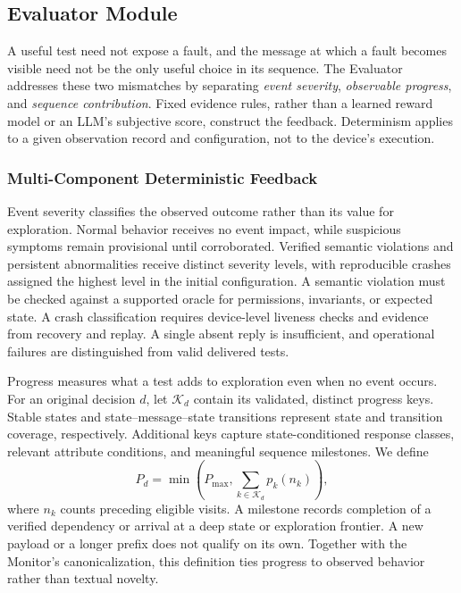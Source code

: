 \documentclass[10pt,journal,compsoc]{IEEEtran}
\begin{document}
\subsection{Evaluator Module}\label{sec:evaluator}
A useful test need not expose a fault, and the message at which a fault becomes visible need not be the only useful choice in its sequence. The Evaluator addresses these two mismatches by separating \emph{event severity}, \emph{observable progress}, and \emph{sequence contribution}. Fixed evidence rules, rather than a learned reward model or an LLM's subjective score, construct the feedback. Determinism applies to a given observation record and configuration, not to the device's execution.

\subsubsection{Multi-Component Deterministic Feedback}
Event severity classifies the observed outcome rather than its value for exploration. Normal behavior receives no event impact, while suspicious symptoms remain provisional until corroborated. Verified semantic violations and persistent abnormalities receive distinct severity levels, with reproducible crashes assigned the highest level in the initial configuration. A semantic violation must be checked against a supported oracle for permissions, invariants, or expected state. A crash classification requires device-level liveness checks and evidence from recovery and replay. A single absent reply is insufficient, and operational failures are distinguished from valid delivered tests.

Progress measures what a test adds to exploration even when no event occurs. For an original decision $d$, let $\mathcal K_d$ contain its validated, distinct progress keys. Stable states and state--message--state transitions represent state and transition coverage, respectively. Additional keys capture state-conditioned response classes, relevant attribute conditions, and meaningful sequence milestones. We define
\begin{equation}
P_d=\min\left(P_{\max},
             \sum_{k\in\mathcal K_d}p_k(n_k)\right),
\label{eq:progress}
\end{equation}
where $n_k$ counts preceding eligible visits. A milestone records completion of a verified dependency or arrival at a deep state or exploration frontier. A new payload or a longer prefix does not qualify on its own. Together with the Monitor's canonicalization, this definition ties progress to observed behavior rather than textual novelty.
\end{document}
